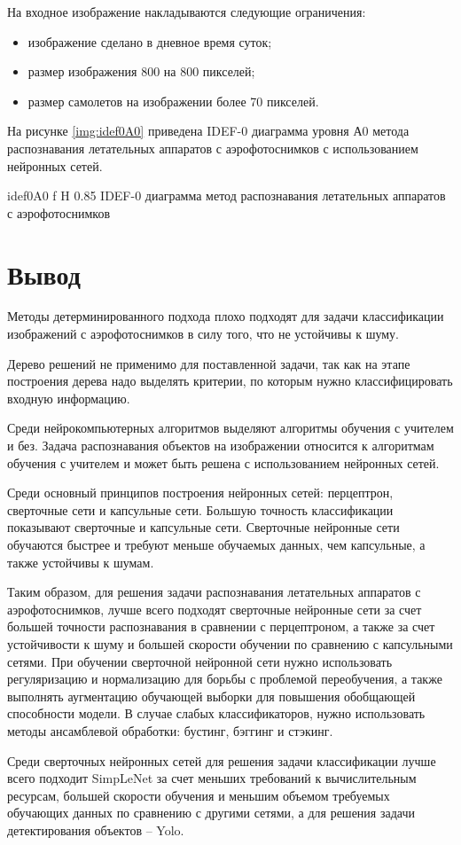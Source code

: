 На входное изображение накладываются следующие ограничения:
\begin{itemize}
	\item изображение сделано в дневное время суток;
	\item размер изображения 800 на 800 пикселей;
	\item размер самолетов на изображении более 70 пикселей.
\end{itemize}

На рисунке \ref{img:idef0A0} приведена IDEF-0 диаграмма уровня А0 метода распознавания летательных аппаратов с аэрофотоснимков с использованием нейронных сетей.

{idef0A0} %
{f} %
{H} %
{0.85\textwidth} %
{IDEF-0 диаграмма метод распознавания летательных аппаратов с аэрофотоснимков} %

\section{Вывод}

Методы детерминированного подхода плохо подходят для задачи классификации изображений с аэрофотоснимков в силу того, что не устойчивы к шуму.

Дерево решений не применимо для поставленной задачи, так как на этапе построения дерева надо выделять критерии, по которым нужно классифицировать входную информацию.

Среди нейрокомпьютерных алгоритмов выделяют алгоритмы обучения с учителем и без. Задача распознавания объектов на изображении относится к алгоритмам обучения с учителем и может быть решена с использованием нейронных сетей.

Среди основный принципов построения нейронных сетей: перцептрон, сверточные сети и капсульные сети. Большую точность классификации показывают сверточные и капсульные сети. Сверточные нейронные сети обучаются быстрее и требуют меньше обучаемых данных, чем капсульные, а также устойчивы к шумам.

Таким образом, для решения задачи распознавания летательных аппаратов с аэрофотоснимков, лучше всего подходят сверточные нейронные сети за счет большей точности распознавания в сравнении с перцептроном, а также за счет устойчивости к шуму и большей скорости обучении по сравнению с капсульными сетями. При обучении сверточной нейронной сети нужно использовать регуляризацию и нормализацию для борьбы с проблемой переобучения, а также выполнять аугментацию обучающей выборки для повышения обобщающей способности модели. В случае слабых классификаторов, нужно использовать методы ансамблевой обработки: бустинг, бэггинг и стэкинг.

Среди сверточных нейронных сетей для решения задачи классификации лучше всего подходит SimpLeNet за счет меньших требований к вычислительным ресурсам, большей скорости обучения и меньшим объемом требуемых обучающих данных по сравнению с другими сетями, а для решения задачи детектирования объектов -- Yolo.